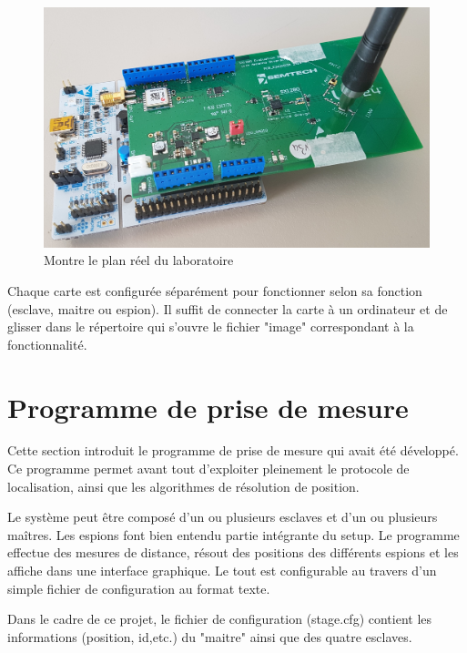 \begin{figure}[htp]
 \begin{center}
  \includegraphics[scale=0.1]{figures/carte.jpg}
  \caption{Montre le plan réel du laboratoire}
  \label{fig:carte} %
 \end{center}
\end{figure}

Chaque carte est configurée séparément pour fonctionner selon sa fonction (esclave, maitre ou espion). Il suffit de connecter la carte à un ordinateur et de glisser dans le répertoire qui s'ouvre le fichier "image" correspondant à la fonctionnalité. 

\section{Programme de prise de mesure \cite{MIC}}

Cette section introduit le programme de prise de mesure qui avait été développé. Ce programme permet avant tout d’exploiter pleinement le protocole de localisation, ainsi que les algorithmes de résolution de position. 

Le système peut être composé d’un ou plusieurs esclaves et d’un ou plusieurs maîtres. Les espions font bien entendu partie intégrante du setup. Le programme effectue des mesures de distance, résout des positions des différents espions et les affiche dans une interface graphique. Le tout est configurable au travers d’un simple fichier de configuration au format texte.

Dans le cadre de ce projet, le fichier de configuration (stage.cfg) contient les informations (position, id,etc.) du "maitre" ainsi que des quatre esclaves. 

